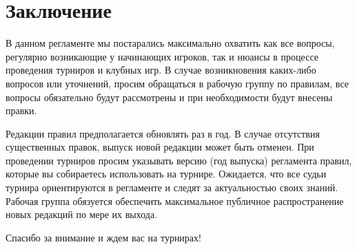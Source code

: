 \newpage

\section{Заключение}

В данном регламенте мы постарались максимально охватить как все вопросы, регулярно возникающие у начинающих игроков, так и нюансы в процессе проведения турниров и клубных игр. В случае возникновения каких-либо вопросов или уточнений, просим обращаться в рабочую группу по правилам, все вопросы обязательно будут рассмотрены и при необходимости будут внесены правки.

Редакции правил предполагается обновлять раз в год. В случае отсутствия существенных правок, выпуск новой редакции может быть отменен. При проведении турниров просим указывать версию (год выпуска) регламента правил, которые вы собираетесь использовать на турнире. Ожидается, что все судьи турнира ориентируются в регламенте и следят за актуальностью своих знаний. Рабочая группа обязуется обеспечить максимальное публичное распространение новых редакций по мере их выхода.

Спасибо за внимание и ждем вас на турнирах!
